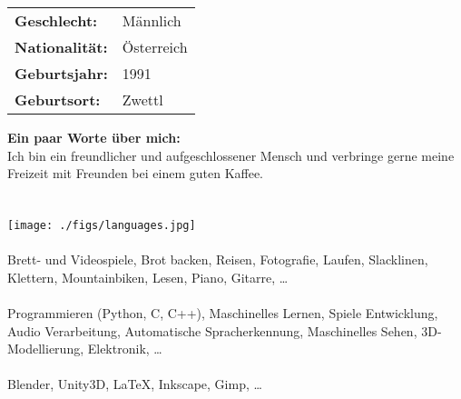 
{


\begin{tabular} { l p{3.9cm} }
  \textbf{Geschlecht:} & Männlich\\
  \textbf{Nationalität:} & Österreich\\
  \textbf{Geburtsjahr:} & 1991\\
  \textbf{Geburtsort:} & Zwettl\\
\end{tabular}

\textbf{Ein paar Worte über mich:}\\
Ich bin ein freundlicher und aufgeschlossener Mensch und verbringe gerne meine Freizeit mit Freunden bei einem guten Kaffee.\\


\\\\
\begingroup \centering \texttt{[image: ./figs/languages.jpg]} \endgroup\\



\\
Brett- und Videospiele, Brot backen, Reisen, Fotografie, Laufen, Slacklinen, Klettern, Mountainbiken, Lesen, Piano, Gitarre, \dots\\


\\
Programmieren (Python, C, C++), Maschinelles Lernen, Spiele Entwicklung, Audio Verarbeitung, Automatische Spracherkennung, Maschinelles Sehen, 3D-Modellierung, Elektronik, \dots\\


\\
Blender, Unity3D, \LaTeX, Inkscape, Gimp, \dots
}
